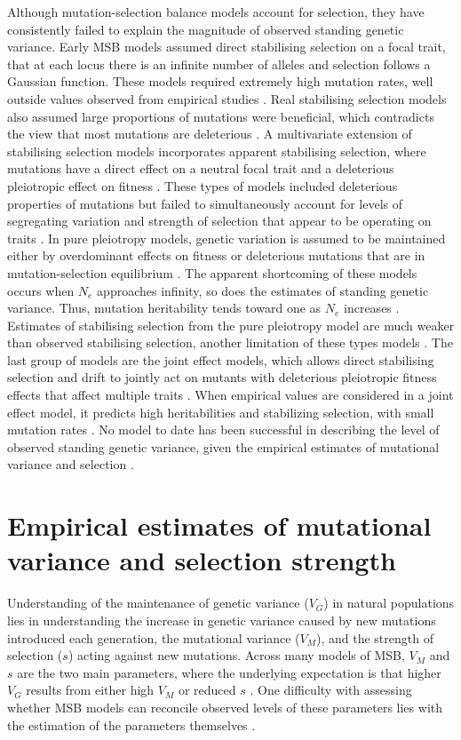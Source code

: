 Although mutation-selection balance models account for selection, they have consistently failed to explain the magnitude of observed standing genetic variance. Early MSB models assumed direct stabilising selection on a focal trait, that at each locus there is an infinite number of alleles and selection follows a Gaussian function. These models required extremely high mutation rates, well outside values observed from empirical studies \citep{Land75, Ture84}. Real stabilising selection models also assumed large proportions of mutations were beneficial, which contradicts the view that most mutations are deleterious \citep{Kond92}. A multivariate extension of stabilising selection models incorporates apparent stabilising selection, where mutations have a direct effect on a neutral focal trait and a deleterious pleiotropic effect on fitness \citep{Ture85, Bart90, Zhan03}. These types of models included deleterious properties of mutations but failed to simultaneously account for levels of segregating variation and strength of selection that appear to be operating on traits \citep{John05}. In pure pleiotropy models, genetic variation is assumed to be maintained either by overdominant effects on fitness or deleterious mutations that are in mutation-selection equilibrium \citep{John05}. The apparent shortcoming of these models occurs when $N_e$ approaches infinity, so does the estimates of standing genetic variance. Thus, mutation heritability tends toward one as $N_e$ increases \citep{Caba94}. Estimates of stabilising selection from the pure pleiotropy model are much weaker than observed stabilising selection, another limitation of these types models \citep{Wals18}. The last group of models are the joint effect models, which allows direct stabilising selection and drift to jointly act on mutants with deleterious pleiotropic fitness effects that affect multiple traits \citep{Zhan02}. When empirical values are considered in a joint effect model, it predicts high heritabilities and stabilizing selection, with small mutation rates \citep{Zhan02}. No model to date has been successful in describing the level of observed standing genetic variance, given the empirical estimates of mutational variance and selection \citep{John05, Houl17}.\par    

\section{Empirical estimates of mutational variance and selection strength} 
Understanding of the maintenance of genetic variance ($V_G$) in natural populations lies in understanding the increase in genetic variance caused by new mutations introduced each generation, the mutational variance ($V_M$), and the strength of selection ($s$) acting against new mutations.  Across many models of MSB, $V_M$ and $s$ are the two main parameters, where the underlying expectation is that higher $V_G$ results from either high $V_M$ or reduced $s$ \citep{Lync99}. One difficulty with assessing whether MSB models can reconcile observed levels of these parameters lies with the estimation of the parameters themselves \citep{Wals18}. \par

